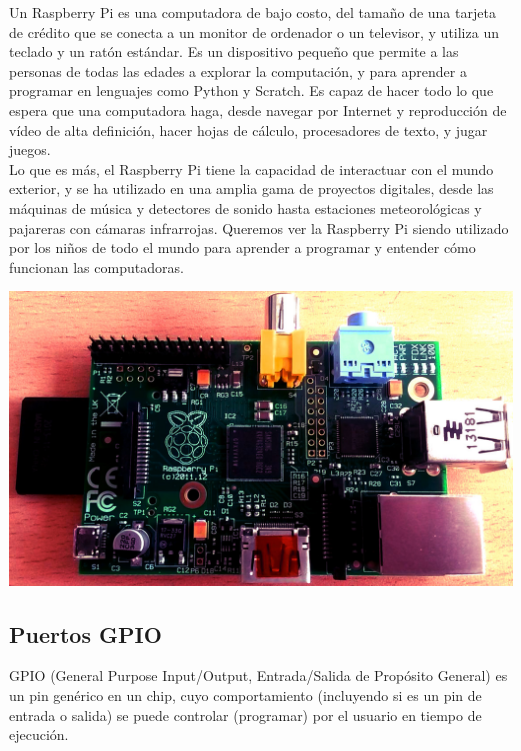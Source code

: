 \documentclass[10pt,a4paper]{book}
\begin{document}
Un Raspberry Pi es una computadora de bajo costo, del tamaño de una  tarjeta de crédito que se conecta a un monitor de ordenador o un televisor, y utiliza un teclado y un ratón estándar. Es un dispositivo pequeño que permite a las personas de todas las edades a explorar la computación, y para aprender a programar en lenguajes como Python y Scratch. Es capaz de hacer todo lo que espera que una computadora haga, desde navegar por Internet y reproducción de vídeo de alta definición, hacer hojas de cálculo, procesadores de texto, y jugar juegos.\\

Lo que es más, el Raspberry Pi tiene la capacidad de interactuar con el mundo exterior, y se ha utilizado en una amplia gama de proyectos  digitales, desde las máquinas de música y detectores de sonido hasta estaciones meteorológicas y  pajareras con cámaras infrarrojas. Queremos ver la Raspberry Pi siendo utilizado por los niños de todo el mundo para aprender a programar y entender cómo funcionan las computadoras.\\

\begin{center}
	\includegraphics[scale=0.35]{raspberry.jpg}
\end{center}

\subsection{Puertos GPIO}

GPIO (General Purpose Input/Output, Entrada/Salida de Propósito General) es un pin genérico en un chip, cuyo comportamiento (incluyendo si es un pin de entrada o salida) se puede controlar (programar) por el usuario en tiempo de ejecución.\\
\end{document}
